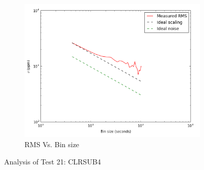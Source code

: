\documentclass[conference]{IEEEtran}
\begin{document}
\begin{figure}[H]
    \begin{subfigure}{3}
        \includegraphics[scale=0.6]{rms_test21}
        \caption{RMS Vs. Bin size}
    \end{subfigure}
    \caption{Analysis of Test 21: CLRSUB4}
\end{figure}
\end{document}

